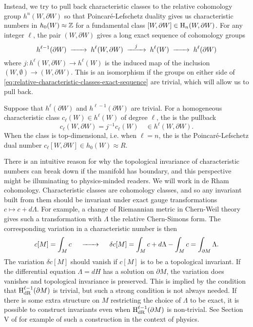 Instead, we try to pull back characteristic classes to the relative cohomology group $h^n(W,\partial W)$ so that Poincar\'e-Lefschetz duality gives us characteristic numbers in $h_0(W)\approx \mathbb{Z}$ for a fundamental class $[W,\partial W]\in \operatorname{H}_n(W,\partial W)$.
For any integer $\ell$, the pair $(W, \partial W)$ gives a long exact sequence of cohomology groups
\begin{equation}\label{eq:relative-characteristic-classes-exact-sequence}
	h^{\ell-1}(\partial W) \lkxto h^{\ell}(W, \partial W) \lkxto[j] h^{\ell}(W) \lkxto h^{\ell}(\partial W)
\end{equation}
where $j : h^{\ell}(W, \partial W) \to h^{\ell}(W)$ is the induced map of the inclusion $(W,\emptyset) \to (W, \partial W)$. This is an isomorphism if the groups on either side of \cref{eq:relative-characteristic-classes-exact-sequence} are trivial, which will allow us to pull back.

\begin{definition}\label{defn:relative-characteristic_form}
	Suppose that $h^{\ell}(\partial W)$ and $h^{\ell-1}(\partial W)$ are trivial. For a homogeneous characteristic class $c_\ell(W) \in h^{\ell}(W)$ of degree $\ell$, the  is the pullback
	\[
		c_\ell(W, \partial W) = j^{-1} c_\ell(W) \quad\in h^{\ell}(W, \partial W).
	\]
	When the class is top-dimensional, i.e. when $\ell=n$, the  is the Poincar\'e-Lefschetz dual number $c_\ell[W,\partial W] \in h_0(W)\approx R$.
\end{definition}

\begin{remark}
	There is an intuitive reason for why the topological invariance of characteristic numbers can break down if the manifold has boundary, and this perspective might be illuminating to physics-minded readers. We will work in de Rham cohomology. Characteristic classes are cohomology classes, and so any invariant built from them should be invariant under exact gauge transformations $c\mapsto c+d\Lambda$. For example, a change of Riemannian metric in Chern-Weil theory gives such a transformation with $\Lambda$ the relative Chern-Simons form. The corresponding variation in a characteristic number is then
	\[
		c[M] = \int_M c \quad\lkxto\quad \delta c[M] = \int_M c+d\Lambda-\int_M c = \int_{\partial M} \Lambda.
	\]
	The variation $\delta c[M]$ should vanish if $c[M]$ is to be a topological invariant. If the differential equation $\Lambda=dH$ has a solution on $\partial M$, the variation does vanishes and topological invariance is preserved. This is implied by the condition that $\operatorname{H}_{\mathrm{dR}}^{\ell-1}(\partial M)$ is trivial, but such a strong condition is not always needed. If there is some extra structure on $M$ restricting the choice of $\Lambda$ to be exact, it is possible to construct invariants even when $\operatorname{H}_{\mathrm{dR}}^{\ell-1}(\partial M)$ is non-trivial. See Section V of \cite{witten1985anomalies} for example of such a construction in the context of physics.
\end{remark}

